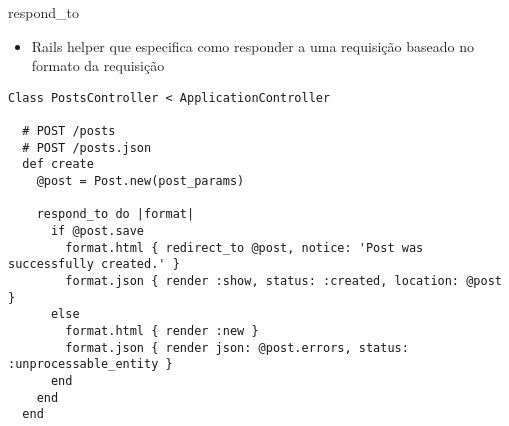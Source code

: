 \begin{frame}{respond\_to}
	\begin{itemize}
		\item Rails \alert{helper} que \alert{especifica como responder a uma requisição} baseado no 
			formato da requisição
	\end{itemize}	
	\begin{lstlisting}[style=RubyInputStyle, caption=controllers/posts\_controller.rb]
Class PostsController < ApplicationController

  # POST /posts
  # POST /posts.json
  def create
    @post = Post.new(post_params)

    respond_to do |format|
      if @post.save
        format.html { redirect_to @post, notice: 'Post was successfully created.' }
        format.json { render :show, status: :created, location: @post }
      else
        format.html { render :new }
        format.json { render json: @post.errors, status: :unprocessable_entity }
      end
    end
  end
	\end{lstlisting}	
\end{frame}
